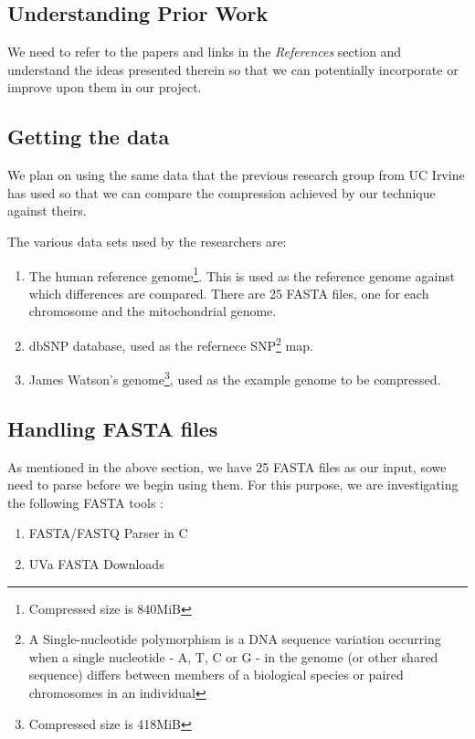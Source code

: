 \documentclass[11pt,twocolumn]{article}
\begin{document}
\subsection*{Understanding Prior Work}

We need to refer to the papers and links in the \textit{References}
section and understand the ideas presented therein so that we can
potentially incorporate or improve upon them in our project.

\subsection*{Getting the data}

We plan on using the same data that the previous research group from
UC Irvine has used so that we can compare the compression achieved by
our technique against theirs.

The various data sets used by the researchers are:

\begin{enumerate}

\item The human reference genome\footnote{Compressed size is
  840MiB}. This is used as the reference genome against which
  differences are compared. There are 25 FASTA files, one for each
  chromosome and the mitochondrial genome.

\item dbSNP database, used as the refernece SNP\footnote{A
  Single-nucleotide polymorphism is a DNA sequence variation occurring
  when a single nucleotide - A, T, C or G - in the genome (or other
  shared sequence) differs between members of a biological species or
  paired chromosomes in an individual} map.

\item James Watson's genome\footnote{Compressed size is 418MiB}, used
  as the example genome to be compressed.

\end{enumerate}


\subsection*{Handling FASTA files}
As mentioned in the above section, we have 25 FASTA files as 
our input, sowe need to parse before we begin using them. 
For this purpose, we are investigating the following FASTA tools :
\begin{enumerate}
\item FASTA/FASTQ Parser in C\cite{7}
\item UVa FASTA Downloads\cite{8}
\end{enumerate}
\end{document}
